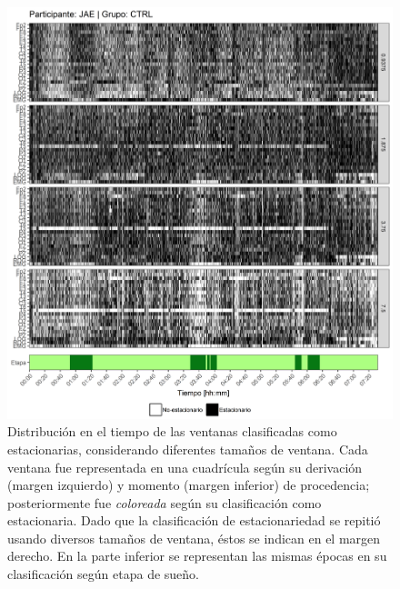 \documentclass[12pt,letterpaper,draft]{book}
\begin{document}
\begin{figure}
\centering
\includegraphics[width=\linewidth]
{./scripts_graf_res/JAE_patrones_1.png}
\caption[Distribución en el tiempo de las ventanas clasificadas como estacionarias, considerando diferentes tamaños de ventana]{Distribución en el tiempo de las ventanas clasificadas como estacionarias, considerando diferentes tamaños de ventana. 
Cada ventana fue representada en una cuadrícula según su derivación (margen izquierdo) y momento (margen inferior) de procedencia; posteriormente fue \textit{coloreada} según su clasificación como estacionaria.
Dado que la clasificación de estacionariedad se repitió usando diversos tamaños de ventana, éstos se indican en el margen derecho.
En la parte inferior se representan las mismas épocas en su clasificación según etapa de sueño.}
\end{figure}
\end{document}
